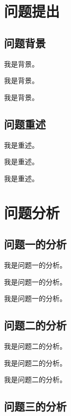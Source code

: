 \documentclass{ManuscriptStyle}
\begin{document}
	\begin{abstract}
        我是摘要。

		我是摘要。

		我是摘要。
	\end{abstract}

	\tableofcontents\newpage
    \clearpage
    \pagestyle{fancy}
 
	\section{问题提出}

	\subsection{问题背景}

	我是背景。

	我是背景。

	我是背景。

	\subsection{问题重述}

	我是重述。

	我是重述。

	我是重述。

	\section{问题分析}

	\subsection{问题一的分析}

	我是问题一的分析。

	我是问题一的分析。

	我是问题一的分析。

	\subsection{问题二的分析}

	我是问题二的分析。

	我是问题二的分析。

	我是问题二的分析。

	\subsection{问题三的分析}
\end{document}
